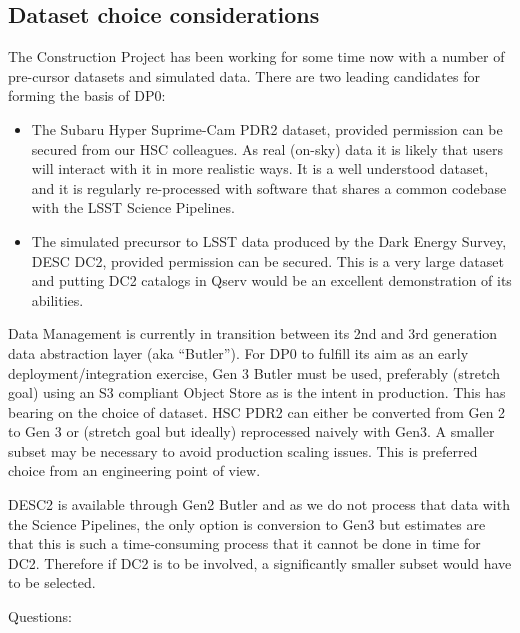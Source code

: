 \subsection {Dataset choice considerations} \label{sec:dataset}

The Construction Project has been working for some time now with a number of pre-cursor datasets and simulated data. There are two leading candidates for forming the basis of DP0:

\begin{itemize}

\item The Subaru Hyper Suprime-Cam PDR2 dataset, provided permission can be secured from our HSC colleagues. As real (on-sky) data it is likely that users will interact with it in more realistic ways. It is a well understood dataset, and it is regularly re-processed with software that shares a common codebase with the LSST Science Pipelines.

\item The simulated precursor to LSST data produced by the Dark Energy Survey, DESC DC2, provided permission can be secured. This is a very large dataset and putting DC2 catalogs in Qserv would be an excellent demonstration of its abilities.

\end{itemize}

Data Management is currently in transition between its 2nd and 3rd generation data abstraction layer (aka ``Butler''). For DP0 to fulfill its aim as an early deployment/integration exercise, Gen 3 Butler must be used, preferably (stretch goal) using an S3 compliant Object Store as is the intent in production. This has bearing on the choice of dataset. HSC PDR2 can either be converted from Gen 2 to Gen 3 or (stretch goal but ideally) reprocessed naively with Gen3. A smaller subset may be necessary to avoid production scaling issues. This is preferred choice from an engineering point of view.

DESC2 is available through Gen2 Butler and as we do not process that data with the Science Pipelines, the only option is conversion to Gen3 but estimates are that this is such a time-consuming process that it cannot be done in time for DC2. Therefore if DC2 is to be involved, a significantly smaller subset would have to be selected.

Questions:

